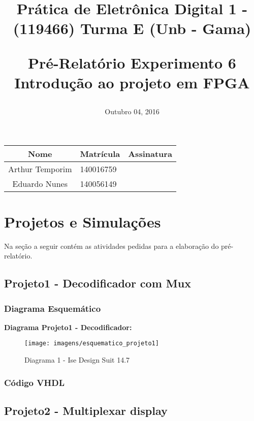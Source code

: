 \documentclass[12pts]{article}
\title{
	Prática de Eletrônica Digital 1 - (119466)
	\singlespacing
		Turma E (Unb - Gama)
	\singlespacing
	\begin{midpage}
	\begin {large}
		Pré-Relatório Experimento 6
		\singlespace
		Introdução ao projeto em FPGA
	\end {large}
	\end{midpage}
}
\date{Outubro 04, 2016}
\begin{document}
\maketitle	
\begin{center}

\begin{tabular}{|c|l|r|}
\hline
Nome & Matrícula & Assinatura\\
\hline
Arthur Temporim & 140016759 & \\
\hline	
Eduardo Nunes & 140056149 & \\
\hline	
\end{tabular}

\end{center}

\pagebreak

\section{Projetos e Simulações}

	Na seção a seguir contém as atividades pedidas para a elaboração do pré-relatório.
\iffalse	
\subsection{Projeto1 - Decodificador com Mux}
\subsubsection{Diagrama Esquemático}

\textbf{Diagrama Projeto1 - Decodificador:}

\begin{figure}[!htb]
  \centering
  \texttt{[image: imagens/esquematico\_projeto1]}
  \caption{Diagrama 1 - Ise Design Suit 14.7}
  \label{figRotulo}
\end{figure}

\newpage
\subsubsection{Código VHDL}



\clearpage

\subsection{Projeto2 - Multiplexar display}
\end{document}
